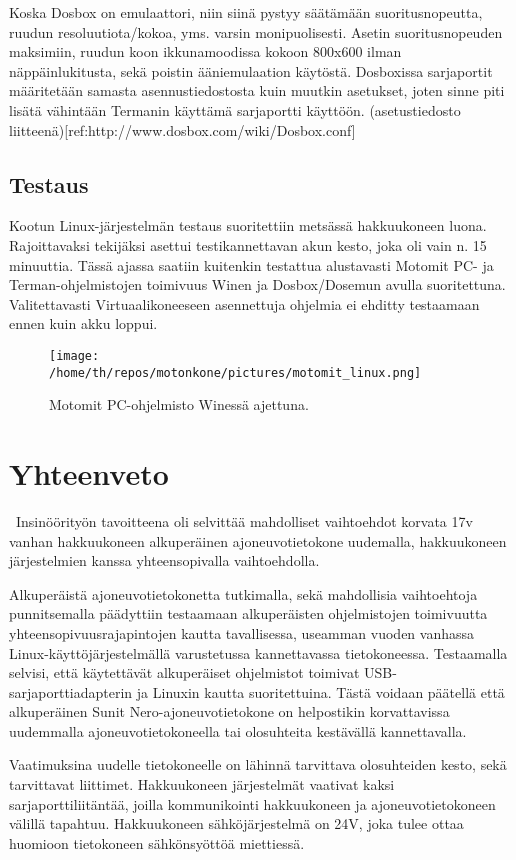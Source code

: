 \documentclass[11pt,a4paper,oneside,article]{memoir}
\begin{document}
Koska Dosbox on emulaattori, niin siinä pystyy säätämään
suoritusnopeutta, ruudun resoluutiota/kokoa, yms. varsin monipuolisesti.
Asetin suoritusnopeuden maksimiin, ruudun koon ikkunamoodissa kokoon
800x600 ilman näppäinlukitusta, sekä poistin ääniemulaation käytöstä.
Dosboxissa sarjaportit määritetään samasta asennustiedostosta kuin
muutkin asetukset, joten sinne piti lisätä vähintään Termanin käyttämä
sarjaportti käyttöön. (asetustiedosto
liitteenä){[}ref:http://www.dosbox.com/wiki/Dosbox.conf{]}



\section{Testaus}
Kootun Linux-järjestelmän testaus suoritettiin metsässä hakkuukoneen luona. Rajoittavaksi tekijäksi asettui testikannettavan akun kesto, joka oli vain n. 15 minuuttia. Tässä ajassa saatiin kuitenkin testattua alustavasti Motomit PC- ja Terman-ohjelmistojen toimivuus Winen ja Dosbox/Dosemun avulla suoritettuna. Valitettavasti Virtuaalikoneeseen asennettuja ohjelmia ei ehditty testaamaan ennen kuin akku loppui.

\begin{figure}[H]
\centering
\texttt{[image: /home/th/repos/motonkone/pictures/motomit\_linux.png]}
\caption{Motomit PC-ohjelmisto Winessä ajettuna.}
\end{figure}

\chapter{Yhteenveto}\
Insinöörityön tavoitteena oli selvittää mahdolliset vaihtoehdot korvata 17v vanhan hakkuukoneen alkuperäinen ajoneuvotietokone uudemalla, hakkuukoneen järjestelmien kanssa yhteensopivalla vaihtoehdolla.

Alkuperäistä ajoneuvotietokonetta tutkimalla, sekä mahdollisia vaihtoehtoja punnitsemalla päädyttiin testaamaan alkuperäisten ohjelmistojen toimivuutta yhteensopivuusrajapintojen kautta tavallisessa, useamman vuoden vanhassa Linux-käyttöjärjestelmällä varustetussa kannettavassa tietokoneessa. Testaamalla selvisi, että käytettävät alkuperäiset ohjelmistot toimivat USB-sarjaporttiadapterin ja Linuxin kautta suoritettuina. Tästä voidaan päätellä että alkuperäinen Sunit Nero-ajoneuvotietokone on helpostikin korvattavissa uudemmalla ajoneuvotietokoneella tai olosuhteita kestävällä kannettavalla.

Vaatimuksina uudelle tietokoneelle on lähinnä tarvittava olosuhteiden kesto, sekä tarvittavat liittimet. Hakkuukoneen järjestelmät vaativat kaksi sarjaporttiliitäntää, joilla kommunikointi hakkuukoneen ja ajoneuvotietokoneen välillä tapahtuu. Hakkuukoneen sähköjärjestelmä on 24V, joka tulee ottaa huomioon tietokoneen sähkönsyöttöä miettiessä. 
\end{document}
